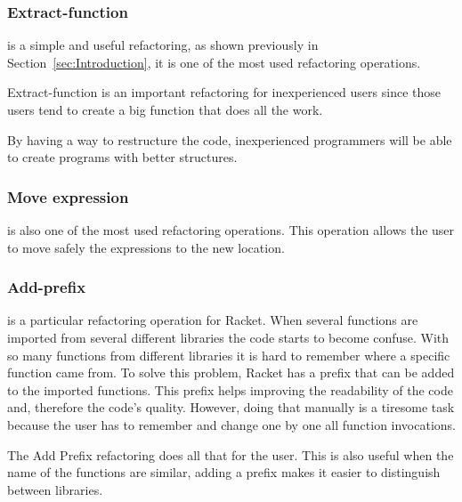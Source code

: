 \subsubsection{Extract-function}

is a simple and useful refactoring, as shown previously in Section~\ref{sec:Introduction}, it is one of the most used refactoring operations.

Extract-function is an important refactoring for inexperienced users since those users tend to create a big function that does all the work.

By having a way to restructure the code, inexperienced programmers will be able to create programs with better structures.




\subsubsection{Move expression}

is also one of the most used refactoring operations.
This operation allows the user to move safely the expressions to the new location.



\subsubsection{Add-prefix}
is a particular refactoring operation for Racket.
When several functions are imported from several different libraries the code starts to become confuse.
With so many functions from different libraries it is hard to remember where a specific function came from.
To solve this problem, Racket has a prefix that can be added to the imported functions.
This prefix helps improving the readability of the code and, therefore the code's quality.
However, doing that manually is a tiresome task because the user has to remember and change one by one all function invocations.

The Add Prefix refactoring does all that for the user.
This is also useful when the name of the functions are similar, adding a prefix makes it easier to distinguish between libraries.





